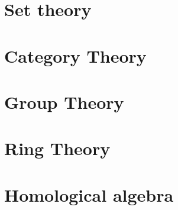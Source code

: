 





\appendix
\section{Set theory}





\section{Category Theory}



\section{Group Theory}




\section{Ring Theory}





\section{Homological algebra}

